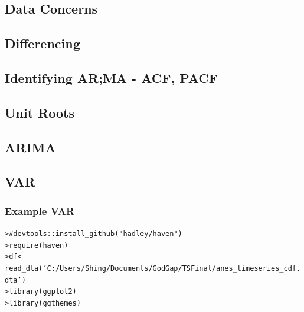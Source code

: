 \documentclass[12pt]{article}\usepackage[]{graphicx}\usepackage[]{color}
\makeatletter
\newcommand{\hlstr}[1]{\textcolor[rgb]{0.82,0.78,0.62}{#1}}%
\newcommand{\hlcom}[1]{\textcolor[rgb]{0.404,0.408,0.42}{#1}}%
\newcommand{\hlstd}[1]{\textcolor[rgb]{0.882,0.878,0.898}{#1}}%
\newcommand{\hlkwb}[1]{\textcolor[rgb]{0.902,0.675,0.196}{#1}}%
\newcommand{\hlkwd}[1]{\textcolor[rgb]{0.733,0.388,0.812}{#1}}%
\newenvironment{kframe}{%
 \def\at@end@of@kframe{}%
 \ifinner\ifhmode%
  \def\at@end@of@kframe{\end{minipage}}%
  \begin{minipage}{\columnwidth}%
 \fi\fi%
 \def\FrameCommand##1{\hskip\@totalleftmargin \hskip-\fboxsep
 \colorbox{shadecolor}{##1}\hskip-\fboxsep
     \hskip-\linewidth \hskip-\@totalleftmargin \hskip\columnwidth}%
 \MakeFramed {\advance\hsize-\width
   \@totalleftmargin\z@ \linewidth\hsize
   \@setminipage}}%
 {\par\unskip\endMakeFramed%
 \at@end@of@kframe}
\newenvironment{knitrout}{}{} %
\makeatother
\begin{document}
\begin{flushleft}
\subsection{Data Concerns}

\subsection{Differencing}

\subsection{Identifying AR;MA - ACF, PACF}

\subsection{Unit Roots}

\subsection{ARIMA}

\subsection{VAR}

\subsubsection{Example VAR}

\begin{knitrout}
\color{fgcolor}\begin{kframe}
\begin{alltt}
\hlstd{> }\hlcom{# devtools::install_github("hadley/haven")}
\hlstd{> }\hlkwd{require}\hlstd{(haven)}
\hlstd{> }\hlstd{df} \hlkwb{<-} \hlkwd{read_dta}\hlstd{(}\hlstr{'C:/Users/Shing/Documents/GodGap/TS Final/anes_timeseries_cdf.dta'}\hlstd{)}
\hlstd{> }\hlkwd{library}\hlstd{(ggplot2)}
\hlstd{> }\hlkwd{library}\hlstd{(ggthemes)}
\end{alltt}
\end{kframe}
\end{knitrout}


\end{flushleft}
\end{document}
